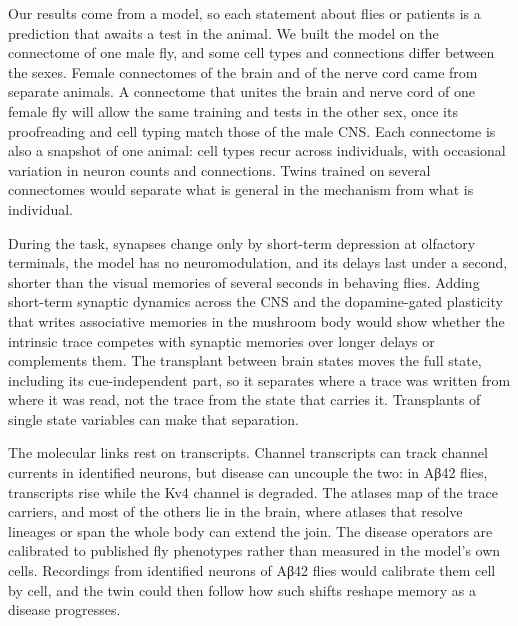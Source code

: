 Our results come from a model, so each statement about flies or patients is a prediction that awaits a test in the animal. We
built the model on the connectome of one male fly, and some cell types and connections differ between the
sexes. Female connectomes of the brain and of the nerve cord came from separate
animals. A connectome that unites the brain and nerve cord of one female
fly will allow the same training and tests in the other sex, once its proofreading and cell typing match
those of the male CNS. Each connectome is also a snapshot of one animal: cell types recur across individuals, with occasional
variation in neuron counts and connections. Twins trained on several connectomes would separate what is
general in the mechanism from what is individual.

During the task, synapses change only by short-term depression at olfactory terminals, the model has no neuromodulation, and
its delays last under a second, shorter than the visual memories of several seconds in behaving
flies. Adding short-term synaptic dynamics across the CNS and the dopamine-gated plasticity that writes associative memories in the mushroom body would show whether the
intrinsic trace competes with synaptic memories over longer delays or complements them. The transplant between brain states
moves the full state, including its cue-independent part, so it separates where a trace was written from where it was read, not
the trace from the state that carries it. Transplants of single state variables can make that separation.

The molecular links rest on transcripts. Channel transcripts can track channel currents in identified
neurons, but disease can uncouple the two: in Aβ42 flies,  transcripts rise
while the Kv4 channel is degraded. The atlases map  of the trace carriers, and most of the others lie
in the brain, where atlases that resolve lineages or span the whole body can extend the
join. The disease operators are calibrated to published fly phenotypes rather than measured in the model's own cells.
Recordings from identified neurons of Aβ42 flies would calibrate them cell by cell, and the twin could then follow how such
shifts reshape memory as a disease progresses.
